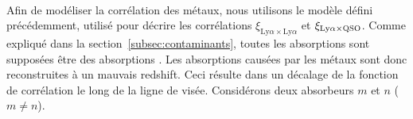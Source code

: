 \paragraph{}
Afin de modéliser la corrélation des métaux, nous utilisons le modèle défini précédemment, utilisé pour décrire les corrélations $\xi_{\mathrm{Ly}\alpha\times\mathrm{Ly}\alpha}$ et $\xi_{\mathrm{Ly}\alpha\times\textsc{\textsc{QSO}}}$.
Comme expliqué dans la section~\ref{subsec:contaminants}, toutes les absorptions sont supposées être des absorptions \lya{}. Les absorptions causées par les métaux sont donc reconstruites à un mauvais redshift. Ceci résulte dans un décalage de la fonction de corrélation le long de la ligne de visée.
Considérons deux absorbeurs $m$ et $n$ ($m \neq n$).
